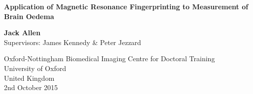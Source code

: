 \begin{titlepage}
    \begin{center}
        \vspace*{5cm}
        
        \textbf{ Application of Magnetic Resonance Fingerprinting to Measurement of Brain Oedema}
        
      
        
        \vspace{1.5cm}
        
        \textbf{Jack Allen}
         \\
Supervisors: James Kennedy \& Peter Jezzard
        \vfill
        
       
        
        \vspace{0.8cm}
        

        
        Oxford-Nottingham Biomedical Imaging Centre for Doctoral Training\\
        University of Oxford\\
        United Kingdom\\
        2nd October 2015
        
    \end{center}
\end{titlepage}
